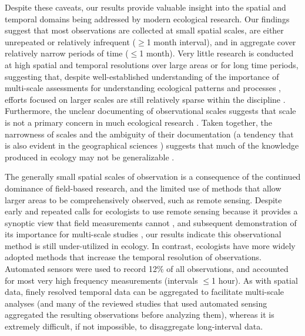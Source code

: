 \documentclass[12pt]{article}
\begin{document}
Despite these caveats, our results provide valuable insight into the spatial and temporal domains being addressed by modern ecological research. Our findings suggest that most observations are collected at small spatial scales, are either unrepeated or relatively infrequent ($\geq$1 month interval), and in aggregate cover relatively narrow periods of time ($\leq$1 month). Very little research is conducted at high spatial and temporal resolutions over large areas or for long time periods, suggesting that, despite well-established understanding of the importance of multi-scale assessments for understanding ecological patterns and processes \cite{levin_problem_1992,wiens_spatial_1989-1}, efforts focused on larger scales are still relatively sparse within the discipline \cite{levin_problem_1992,wiens_spatial_1989-1}. Furthermore, the unclear documenting of observational scales suggests that scale is not a primary concern in much ecological research \cite{chave_problem_2013, wheatley_factors_2009}. Taken together, the narrowness of scales and the ambiguity of their documentation (a tendency that is also evident in the geographical sciences \cite{margulies_ambiguous_2016}) suggests that much of the knowledge produced in ecology may not be generalizable \cite{margulies_ambiguous_2016,wheatley_factors_2009,wiens_spatial_1989-1}.   

The generally small spatial scales of observation is a consequence of the continued dominance of field-based research, and the limited use of methods that allow larger areas to be comprehensively observed, such as remote sensing. Despite early and repeated calls for ecologists to use remote sensing because it provides a synoptic view that field measurements cannot \cite{turner_remote_2003, kerr_space_2003, pettorelli_satellite_2014}, and subsequent demonstration of its importance for multi-scale studies \cite{estes_habitat_2008, estes_predictive_2011}, our results indicate this observational method is still under-utilized in ecology.  In contrast, ecologists have more widely adopted methods that increase the temporal resolution of observations. Automated sensors were used to record 12\% of all observations, and accounted for most very high frequency measurements (intervals $\leq$1 hour). As with spatial data, finely resolved temporal data can be aggregated to facilitate multi-scale analyses (and many of the reviewed studies that used automated sensing aggregated the resulting observations before analyzing them), whereas it is extremely difficult, if not impossible, to disaggregate long-interval data. 
\end{document}
